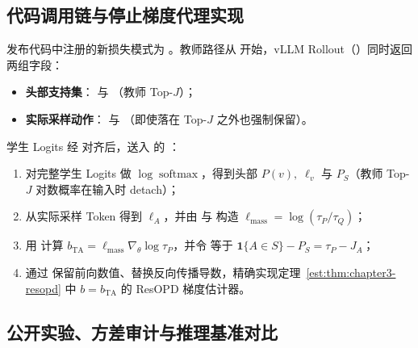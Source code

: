 \documentclass[lang=cn,scheme=chinese,openany]{elegantbook}
\begin{document}
\subsection{代码调用链与停止梯度代理实现}

发布代码中注册的新损失模式为 。教师路径从  开始，vLLM Rollout（）同时返回两组字段：
\begin{itemize}
\item \textbf{头部支持集}： 与 （教师 Top-$J$）；
\item \textbf{实际采样动作}： 与 （即使落在 Top-$J$ 之外也强制保留）。
\end{itemize}
学生 Logits 经  对齐后，送入  的 ：
\begin{enumerate}
\item 对完整学生 Logits 做 $\log\operatorname{softmax}$，得到头部 $P(v),\;\ell_v$ 与 $P_S$（教师 Top-$J$ 对数概率在输入时 detach）；
\item 从实际采样 Token 得到 $\ell_A$，并由  与  构造 $\ell_{\mathrm{mass}}=\log(\tau_P/\tau_Q)$；
\item 用  计算 $b_{\mathrm{TA}}=\ell_{\mathrm{mass}}\nabla_\theta\log\tau_P$，并令  等于 $\mathbf1\{A\in S\}-P_S=\tau_P-J_A$；
\item 通过  保留前向数值、替换反向传播导数，精确实现定理~\ref{est:thm:chapter3-resopd} 中 $b=b_{\mathrm{TA}}$ 的 ResOPD 梯度估计器。
\end{enumerate}

\subsection{公开实验、方差审计与推理基准对比}
\end{document}
